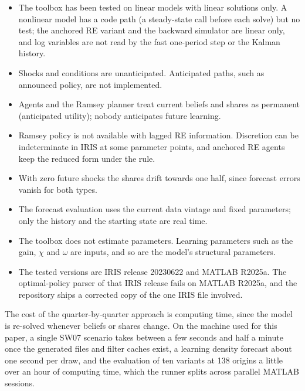 \documentclass[pdflatex,sn-basic]{sn-jnl}
\begin{document}
\begin{itemize}
\item The toolbox has been tested on linear models with linear solutions only. A nonlinear model
      has a code path (a steady-state call before each solve) but no test; the anchored RE variant
      and the backward simulator are linear only, and log variables are not read by the fast
      one-period step or the Kalman history.
\item Shocks and conditions are unanticipated. Anticipated paths, such as announced policy, are
      not implemented.
\item Agents and the Ramsey planner treat current beliefs and shares as permanent (anticipated
      utility); nobody anticipates future learning.
\item Ramsey policy is not available with lagged RE information. Discretion can be indeterminate
      in IRIS at some parameter points, and anchored RE agents keep the reduced form under the rule.
\item With zero future shocks the shares drift towards one half, since forecast errors vanish
      for both types.
\item The forecast evaluation uses the current data vintage and fixed parameters; only the
      history and the starting state are real time.
\item The toolbox does not estimate parameters. Learning parameters such as the gain, $\chi$ and
      $\omega$ are inputs, and so are the model's structural parameters.
\item The tested versions are IRIS release 20230622 and MATLAB R2025a. The optimal-policy parser
      of that IRIS release fails on MATLAB R2025a, and the repository ships a corrected copy of the
      one IRIS file involved.
\end{itemize}

The cost of the quarter-by-quarter approach is computing time, since the model is re-solved
whenever beliefs or shares change. On the machine used for this paper, a single SW07 scenario takes
between a few seconds and half a minute once the generated files and filter caches exist, a
learning density forecast
about one second per draw, and the evaluation of ten variants at 138 origins a little over an hour
of computing time, which the runner splits across parallel MATLAB sessions.
\end{document}
